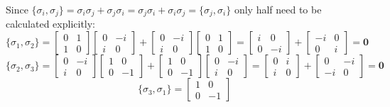 \documentclass[12pt]{exam}
\begin{document}
\begin{solution}
    Since $\{\sigma_i,\sigma_j\} = \sigma_i\sigma_j + \sigma_j\sigma_i =  \sigma_j\sigma_i +\sigma_i\sigma_j = \{\sigma_j,\sigma_i\}$ only half need to be calculated explicitly:
    $$\{\sigma_1,\sigma_2\}= \begin{bmatrix}
        0 & 1 \\ 1 & 0
    \end{bmatrix}\begin{bmatrix}
        0 & -i \\ i & 0
    \end{bmatrix} + \begin{bmatrix}
        0 & -i \\ i & 0
    \end{bmatrix}\begin{bmatrix}
        0 & 1 \\ 1 & 0
    \end{bmatrix} =\begin{bmatrix}
        i & 0 \\ 0 & -i
    \end{bmatrix}+\begin{bmatrix}
        -i & 0 \\ 0 & i
    \end{bmatrix} = \textbf{0}
    $$ $$
    \{\sigma_2,\sigma_3\}=\begin{bmatrix}
        0 & -i \\ i & 0
    \end{bmatrix}\begin{bmatrix}
        1 & 0 \\ 0 & -1
    \end{bmatrix}+\begin{bmatrix}
        1 & 0 \\ 0 & -1
    \end{bmatrix}\begin{bmatrix}
        0 & -i \\ i & 0
    \end{bmatrix} = \begin{bmatrix}
        0 & i \\ i & 0
    \end{bmatrix}+\begin{bmatrix}
        0 & -i \\ -i & 0
    \end{bmatrix} = \textbf{0}
    $$ $$
    \{\sigma_3,\sigma_1\} =\begin{bmatrix}
        1 & 0 \\ 0 & -1

\end{bmatrix}$$
\end{solution}
\end{document}
